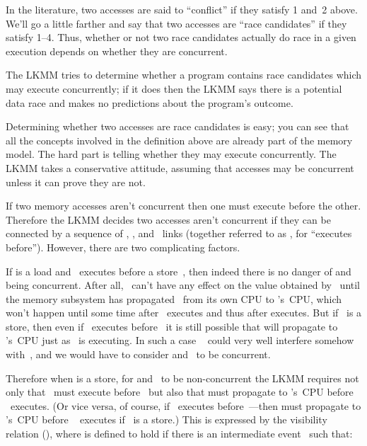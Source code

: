 In the literature, two accesses are said to ``conflict'' if they satisfy
1 and~2 above.
We'll go a little farther and say that two accesses
are ``race candidates'' if they satisfy 1--4.
Thus, whether or not two
race candidates actually do race in a given execution depends on
whether they are concurrent.

The LKMM tries to determine whether a program contains race candidates
which may execute concurrently; if it does then the LKMM says there is
a potential data race and makes no predictions about the program's
outcome.

Determining whether two accesses are race candidates is easy; you can
see that all the concepts involved in the definition above are already
part of the memory model.
The hard part is telling whether they may
execute concurrently.
The LKMM takes a conservative attitude,
assuming that accesses may be concurrent unless it can prove they
are not.

If two memory accesses aren't concurrent then one must execute before
the other.
Therefore the LKMM decides two accesses aren't concurrent
if they can be connected by a sequence of , , and~ links
(together referred to as , for ``executes before'').
However, there
are two complicating factors.

If  is a load and ~executes before a store~, then
indeed there is
no danger of  and~ being concurrent.
After all, ~can't have any
effect on the value obtained by~ until the memory subsystem has
propagated~ from its own CPU to 's~CPU, which won't happen until
some time after ~executes and thus after  executes.
But if ~is a
store, then even if ~executes before~ it is still possible
that 
will propagate to 's~CPU just as ~is executing.
In such a case ~%
could very well interfere somehow with~, and we would have to
consider  and~ to be concurrent.

Therefore when  is a store, for  and~ to be
non-concurrent the LKMM
requires not only that ~must execute before~ but also that
 must
propagate to 's~CPU before ~executes.
(Or vice versa, of course, if
~executes before~---then  must propagate to
's~CPU before ~%
executes if ~is a store.)
This is expressed by the visibility
relation (), where  is defined to hold if there is an
intermediate event~ such that:

